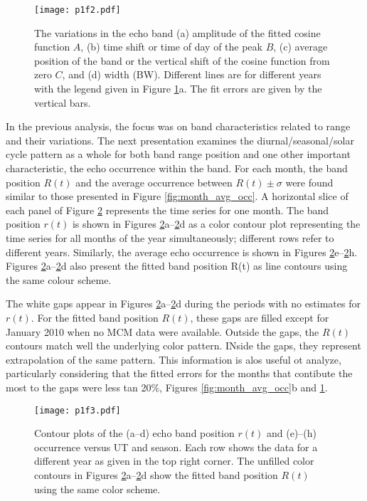 \begin{figure}
	\centering
	\texttt{[image: p1f2.pdf]}
	\caption[Trends in high-occurrence band]{The variations in the echo band (a) amplitude of the fitted cosine function \(A\), (b) time shift or time of day of the peak \(B\), (c) average position of the band or the vertical shift of the cosine function from zero \(C\), and (d) width (BW). Different lines are for different years with the legend given in Figure \ref{fig:year_line}a.  The fit errors are given by the vertical bars.}
	\label{fig:year_line}
\end{figure}

In the previous analysis, the focus was on band characteristics related to range and their variations. The next presentation examines the diurnal/seasonal/solar cycle pattern as a whole for both band range position and one other important characteristic, the echo occurrence within the band. For each month, the band position \(R\left(t\right)\) and the average occurrence between \(R\left(t\right)\pm \sigma\) were found similar to those presented in Figure \ref{fig:month_avg_occ}. A horizontal slice of each panel of Figure \ref{fig:year_color} represents the time series for one month. The band position \(r\left(t\right)\) is shown in Figures \ref{fig:year_color}a--\ref{fig:year_color}d as a color contour plot representing the time series for all months of the year simultaneously; different rows refer to  different years. Similarly, the average echo occurrence is shown in Figures \ref{fig:year_color}e--\ref{fig:year_color}h.  Figures \ref{fig:year_color}a--\ref{fig:year_color}d also present the fitted band position R(t) as line contours using the same colour scheme.

The white gaps appear in Figures \ref{fig:year_color}a--\ref{fig:year_color}d during the periods with no estimates for \(r(t)\).  For the fitted band position \(R(t)\), these gaps are filled except for January 2010 when no MCM data were available.  Outside the gaps, the \(R(t)\) contours match well the underlying color pattern.  INside the gaps, they represent extrapolation of the same pattern. This information is alos useful ot analyze, particularly considering that the fitted errors for the months that contibute the most to the gaps were less tan 20\%, Figures \ref{fig:month_avg_occ}b and \ref{fig:year_line}.
	
\begin{figure}
	\centering
	\texttt{[image: p1f3.pdf]}
	\caption[Solar cycle trends of high-occurrence band]{Contour plots of the (a--d) echo band position \(r(t)\) and (e)--(h) occurrence versus UT and season. Each row shows the data for a different year as given in the top right corner.  The unfilled color contours in Figures \ref{fig:year_color}a--\ref{fig:year_color}d show the fitted band position \(R(t)\) using the same color scheme.}
	\label{fig:year_color}
\end{figure}

